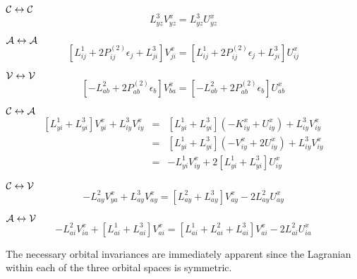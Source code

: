 \documentclass[fleqn,12pt]{article}
\newcommand{\Core}{{\cal C}}
\newcommand{\Active}{{\cal A}}
\newcommand{\Virtual}{{\cal V}}
\newcommand{\Ptwo}{P^{(2)}}
\begin{document}
$\Core \leftrightarrow \Core$
\begin{equation}
  L^3_{yz} V^x_{yz} = L^3_{yz} U^x_{yz}
\end{equation}

$\Active \leftrightarrow \Active$
\begin{equation}
  \left[ L^1_{ij} + 2 \Ptwo_{ij} \epsilon_j + L^3_{ji} \right]
  V^x_{ji} = \left[ L^1_{ij} + 2 \Ptwo_{ij} \epsilon_j + L^3_{ji}
  \right] U^x_{ij}
\end{equation}

$\Virtual \leftrightarrow \Virtual$
\begin{equation}
  \left[ -L^2_{ab} + 2 \Ptwo_{ab} \epsilon_b \right] V^x_{ba} = 
  \left[ -L^2_{ab} + 2 \Ptwo_{ab} \epsilon_b \right] U^x_{ab}
\end{equation}

$\Core \leftrightarrow \Active$
\begin{eqnarray}
  \left[ L^1_{yi} + L^3_{yi} \right]V^x_{yi} + L^3_{iy}V^x_{iy} 
  & = & \left[ L^1_{yi} + L^3_{yi} \right]\left( -K^x_{iy} + U^x_{iy}
    \right) + L^3_{iy}V^x_{iy} \nonumber \\
  & = & \left[ L^1_{yi} + L^3_{yi} \right]\left( -V^x_{iy} + 2U^x_{iy}
    \right) + L^3_{iy}V^x_{iy} \nonumber \\
  & = & -L^1_{yi}V^x_{iy} + 2 \left[ L^1_{yi} + L^3_{yi} \right]
  U^x_{iy} \label{eqn:l1yi}
\end{eqnarray}

$\Core \leftrightarrow \Virtual$
\begin{equation}
\label{eqn:cv1}
  -L^2_{ay}V^x_{ya} + L^3_{ay}V^x_{ay} =
  \left[L^2_{ay} + L^3_{ay}\right] V^x_{ay} - 2L^2_{ay}U^x_{ay}
\end{equation}

$\Active \leftrightarrow \Virtual$
\begin{equation}
\label{eqn:av1}
  -L^2_{ai} V^x_{ia} + \left[ L^1_{ai} + L^3_{ai} \right] V^x_{ai} = 
 \left[ L^1_{ai} + L^2_{ai} + L^3_{ai} \right] V^x_{ai} - 2 L^2_{ai} U^x_{ia}
\end{equation}

The necessary orbital invariances are immediately apparent since 
the Lagranian within each of the three orbital spaces is symmetric.
\end{document}
